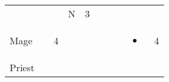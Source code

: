 \documentclass[12pt]{article}
\newcommand{\indexClass}[1]{\index{#1}}
\newcommand{\class}[1]{#1\indexClass{#1}}
\begin{document}
\begin{longtable}[]{@{}llllllllll@{}}
\begin{minipage}[t]{0.06\columnwidth}
\strut\end{minipage} &
\begin{minipage}[t]{0.06\columnwidth}\raggedright\strut
\strut\end{minipage} &
\begin{minipage}[t]{0.06\columnwidth}\raggedright\strut
\strut\end{minipage} &
\begin{minipage}[t]{0.07\columnwidth}\raggedright\strut
N
\strut\end{minipage} &
\begin{minipage}[t]{0.08\columnwidth}\raggedright\strut
3
\strut\end{minipage}\tabularnewline
\begin{minipage}[t]{0.13\columnwidth}\raggedright\strut
\class{Mage}
\strut\end{minipage} &
\begin{minipage}[t]{0.06\columnwidth}\raggedright\strut
\strut\end{minipage} &
\begin{minipage}[t]{0.06\columnwidth}\raggedright\strut
4
\strut\end{minipage} &
\begin{minipage}[t]{0.06\columnwidth}\raggedright\strut
\strut\end{minipage} &
\begin{minipage}[t]{0.06\columnwidth}\raggedright\strut
\strut\end{minipage} &
\begin{minipage}[t]{0.06\columnwidth}\raggedright\strut
\strut\end{minipage} &
\begin{minipage}[t]{0.06\columnwidth}\raggedright\strut
\strut\end{minipage} &
\begin{minipage}[t]{0.06\columnwidth}\raggedright\strut
\strut\end{minipage} &
\begin{minipage}[t]{0.07\columnwidth}\raggedright\strut
\begin{itemize}
\item
\end{itemize}
\strut\end{minipage} &
\begin{minipage}[t]{0.08\columnwidth}\raggedright\strut
4
\strut\end{minipage}\tabularnewline
\begin{minipage}[t]{0.13\columnwidth}\raggedright\strut
\class{Priest}

\end{minipage}
\end{longtable}
\end{document}
